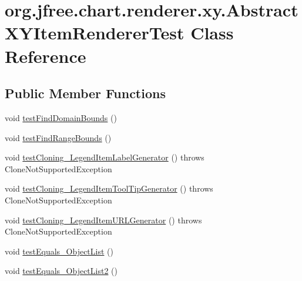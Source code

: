 \hypertarget{classorg_1_1jfree_1_1chart_1_1renderer_1_1xy_1_1_abstract_x_y_item_renderer_test}{}\section{org.\+jfree.\+chart.\+renderer.\+xy.\+Abstract\+X\+Y\+Item\+Renderer\+Test Class Reference}
\label{classorg_1_1jfree_1_1chart_1_1renderer_1_1xy_1_1_abstract_x_y_item_renderer_test}
\subsection*{Public Member Functions}
\begin{DoxyCompactItemize}
\item 
void \mbox{\hyperlink{classorg_1_1jfree_1_1chart_1_1renderer_1_1xy_1_1_abstract_x_y_item_renderer_test_a3c14354dfcae08fd29079600ff53f0ac}{test\+Find\+Domain\+Bounds}} ()
\item 
void \mbox{\hyperlink{classorg_1_1jfree_1_1chart_1_1renderer_1_1xy_1_1_abstract_x_y_item_renderer_test_a06ea4aa156d8a454285c56395d35a272}{test\+Find\+Range\+Bounds}} ()
\item 
void \mbox{\hyperlink{classorg_1_1jfree_1_1chart_1_1renderer_1_1xy_1_1_abstract_x_y_item_renderer_test_a895949dc0de157636ec7d1f98bbd986a}{test\+Cloning\+\_\+\+Legend\+Item\+Label\+Generator}} ()  throws Clone\+Not\+Supported\+Exception 
\item 
void \mbox{\hyperlink{classorg_1_1jfree_1_1chart_1_1renderer_1_1xy_1_1_abstract_x_y_item_renderer_test_af628c36c5cf3984baeb7248f5ee915b6}{test\+Cloning\+\_\+\+Legend\+Item\+Tool\+Tip\+Generator}} ()  throws Clone\+Not\+Supported\+Exception 
\item 
void \mbox{\hyperlink{classorg_1_1jfree_1_1chart_1_1renderer_1_1xy_1_1_abstract_x_y_item_renderer_test_ac2dadf6932ce30baec90eb6ddcec77f5}{test\+Cloning\+\_\+\+Legend\+Item\+U\+R\+L\+Generator}} ()  throws Clone\+Not\+Supported\+Exception 
\item 
void \mbox{\hyperlink{classorg_1_1jfree_1_1chart_1_1renderer_1_1xy_1_1_abstract_x_y_item_renderer_test_a01cce773e383482d66d7b107afc480b5}{test\+Equals\+\_\+\+Object\+List}} ()
\item 
void \mbox{\hyperlink{classorg_1_1jfree_1_1chart_1_1renderer_1_1xy_1_1_abstract_x_y_item_renderer_test_a70891118b9624800488876501dddaed2}{test\+Equals\+\_\+\+Object\+List2}} ()
\end{DoxyCompactItemize}


